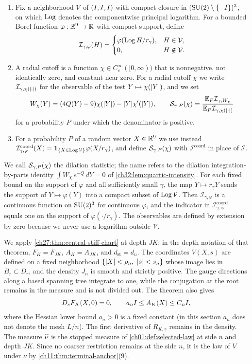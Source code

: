 \begin{definition}
\begin{enumerate}
\item Fix a neighborhood $\mathcal V$ of $(I,I,I)$ with compact closure in $(\mathrm{SU}(2)\setminus\{-I\})^3$, on which $\operatorname{Log}$ denotes the componentwise principal logarithm. For a bounded Borel function $\varphi:\mathbb R^9\to\mathbb R$ with compact support, define
\[
 \mathcal I_{\gamma,\varphi}(H)=
 \begin{cases}
 \varphi(\operatorname{Log} H/r_\gamma),&H\in\mathcal V,\\
 0,&H\notin\mathcal V.
 \end{cases}
\]
\item A radial cutoff is a function $\chi\in C_c^\infty([0,\infty))$ that is nonnegative, not identically zero, and constant near zero. For a radial cutoff $\chi$ we write $\mathcal I_{\gamma,\chi(\lvert \cdot\rvert)}$ for the observable of the test $Y\mapsto\chi(\lvert Y\rvert)$, and we set
\[
 W_\chi(Y)=(4Q(Y)-9)\chi(\lvert Y\rvert)-\lvert Y\rvert\chi'(\lvert Y\rvert),\qquad
 \mathcal S_{\gamma,P}(\chi)=\frac{\mathbb E_P\mathcal I_{\gamma,W_\chi}}{\mathbb E_P\mathcal I_{\gamma,\chi(\lvert \cdot\rvert)}}
\]
for a probability $P$ under which the denominator is positive.
\item For a probability $P$ of a random vector $X\in\mathbb R^9$ we use instead $\mathcal I^{\mathrm{coord}}_{\gamma,\varphi}(X)=\mathbf 1_{\{X\in\operatorname{Log}\mathcal V\}}\varphi(X/r_\gamma)$, and define $\mathcal S_{\gamma,P}(\chi)$ with $\mathcal I^{\mathrm{coord}}$ in place of $\mathcal I$.
\end{enumerate}
\end{definition}

We call $\mathcal S_{\gamma,P}(\chi)$ the dilation statistic; the name refers to the dilation integration-by-parts identity $\int W_\chi\,e^{-Q}\,dY=0$ of \cref{ch32:lem:quartic-intensity}. For each fixed bound on the support of $\varphi$ and all sufficiently small $\gamma$, the map $Y\mapsto r_\gamma Y$ sends the support of $Y\mapsto\varphi(Y)$ into a compact subset of $\operatorname{Log}\mathcal V$. Then $\mathcal I_{\gamma,\varphi}$ is a continuous function on $\mathrm{SU}(2)^3$ for continuous $\varphi$, and the indicator in $\mathcal I^{\mathrm{coord}}_{\gamma,\varphi}$ equals one on the support of $\varphi(\cdot/r_\gamma)$. The observables are defined by extension by zero because we never use a logarithm outside $\mathcal V$.

We apply \cref{ch27:thm:central-stiff-chart} at depth $JK$; in the depth notation of that theorem, $F_K=F_{JK}$, $A_K=A_{JK}$, and $d_{\mathrm{st}}=d_n$. The coordinates $V(X,s)$ are defined on a fixed neighborhood $\{\lvert X\rvert<\rho_n,\ \lvert s\rvert<s_n\}$ whose image lies in $B_r\subset D_r$, and the density $J_n$ is smooth and strictly positive. The gauge directions along a based spanning tree integrate to one, while the conjugation at the root remains in the measure and is not divided out. The theorem also gives
\[
 D_sF_K(X,0)=0,\qquad a_nI\le A_K(X)\le C_nI,
\]
where the Hessian lower bound $a_n>0$ is a fixed constant (in this section $a_n$ does not denote the mesh $L/n$).
The first derivative of $\overline R_{K,\gamma}$ remains in the density. The measure $\widehat\nu$ is the stopped measure of \cref{ch01:def:selected-law} at side $n$ and depth $JK$. Since no coarser restriction remains at the side $n$, it is the law of $V$ under $\nu$ by \cref{ch11:thm:terminal-anchor}(9).

